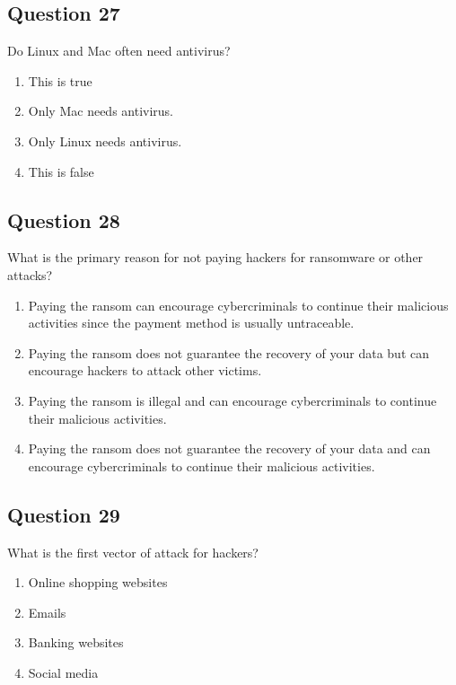 \documentclass[12pt,a4paper]{article}
\begin{document}
\bigskip


\subsection*{Question 27}
Do Linux and Mac often need antivirus?

\begin{enumerate}[label=\Alph*., leftmargin=*]
\item This is true
\item Only Mac needs antivirus.
\item Only Linux needs antivirus.
\item This is false
\end{enumerate}

\bigskip


\subsection*{Question 28}
What is the primary reason for not paying hackers for ransomware or other attacks?

\begin{enumerate}[label=\Alph*., leftmargin=*]
\item Paying the ransom can encourage cybercriminals to continue their malicious activities since the payment method is usually untraceable.
\item Paying the ransom does not guarantee the recovery of your data but can encourage hackers to attack other victims.
\item Paying the ransom is illegal and can encourage cybercriminals to continue their malicious activities.
\item Paying the ransom does not guarantee the recovery of your data and can encourage cybercriminals to continue their malicious activities.
\end{enumerate}

\bigskip


\subsection*{Question 29}
What is the first vector of attack for hackers?

\begin{enumerate}[label=\Alph*., leftmargin=*]
\item Online shopping websites
\item Emails
\item Banking websites
\item Social media
\end{enumerate}
\end{document}
